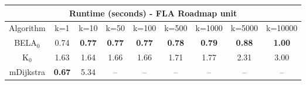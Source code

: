\begin{tabular}{c|cccccccc}\toprule
\multicolumn{9}{c}{Runtime (seconds) - FLA Roadmap unit}\\ \midrule
Algorithm & k=1 & k=10 & k=50 & k=100 & k=500 & k=1000 & k=5000 & k=10000 \\ \midrule
BELA$_0$ & 0.74 & \textbf{0.77} & \textbf{0.77} & \textbf{0.77} & \textbf{0.78} & \textbf{0.79} & \textbf{0.88} & \textbf{1.00} \\
K$_0$ & 1.63 & 1.64 & 1.66 & 1.66 & 1.71 & 1.77 & 2.31 & 3.00 \\
mDijkstra & \textbf{0.67} & 5.34 & -- & -- & -- & -- & -- & -- \\ \bottomrule 
\end{tabular}

